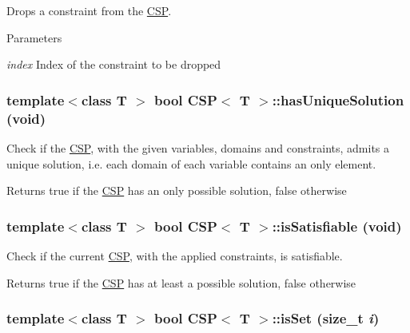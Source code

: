 Drops a constraint from the \hyperlink{classCSP}{CSP}. 


\begin{DoxyParams}{Parameters}
\item[{\em index}]Index of the constraint to be dropped \end{DoxyParams}
\hypertarget{classCSP_ae96286c6c7dfb6fe077544e0d4af15f4}{
\subsubsection[{hasUniqueSolution}]{\setlength{\rightskip}{0pt plus 5cm}template$<$class T $>$ bool {\bf CSP}$<$ T $>$::hasUniqueSolution (void)}}
\label{classCSP_ae96286c6c7dfb6fe077544e0d4af15f4}


Check if the \hyperlink{classCSP}{CSP}, with the given variables, domains and constraints, admits a unique solution, i.e. each domain of each variable contains an only element. 

\begin{DoxyReturn}{Returns}
true if the \hyperlink{classCSP}{CSP} has an only possible solution, false otherwise 
\end{DoxyReturn}
\hypertarget{classCSP_a7ef9eb91c38815c9d82182696a6bd5d3}{
\subsubsection[{isSatisfiable}]{\setlength{\rightskip}{0pt plus 5cm}template$<$class T $>$ bool {\bf CSP}$<$ T $>$::isSatisfiable (void)}}
\label{classCSP_a7ef9eb91c38815c9d82182696a6bd5d3}


Check if the current \hyperlink{classCSP}{CSP}, with the applied constraints, is satisfiable. 

\begin{DoxyReturn}{Returns}
true if the \hyperlink{classCSP}{CSP} has at least a possible solution, false otherwise 
\end{DoxyReturn}
\hypertarget{classCSP_a213dafc1aae7b1825371810a511eca4f}{
\subsubsection[{isSet}]{\setlength{\rightskip}{0pt plus 5cm}template$<$class T $>$ bool {\bf CSP}$<$ T $>$::isSet (size\_\-t {\em i})}}
\label{classCSP_a213dafc1aae7b1825371810a511eca4f}


